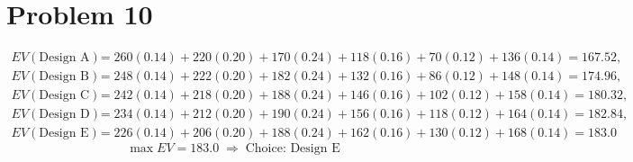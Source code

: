 	\section*{Problem 10}
	\[
	\begin{aligned}
	EV(\text{Design A}) &= 260(0.14)+220(0.20)+170(0.24)+118(0.16)+70(0.12)+136(0.14)=167.52,\\
	EV(\text{Design B}) &= 248(0.14)+222(0.20)+182(0.24)+132(0.16)+86(0.12)+148(0.14)=174.96,\\
	EV(\text{Design C}) &= 242(0.14)+218(0.20)+188(0.24)+146(0.16)+102(0.12)+158(0.14)=180.32,\\
	EV(\text{Design D}) &= 234(0.14)+212(0.20)+190(0.24)+156(0.16)+118(0.12)+164(0.14)=182.84,\\
	EV(\text{Design E}) &= 226(0.14)+206(0.20)+188(0.24)+162(0.16)+130(0.12)+168(0.14)=183.0
	\end{aligned}
	\]
	\[
	\max EV = 183.0 \;\Rightarrow\; \text{Choice: Design E}
	\]


